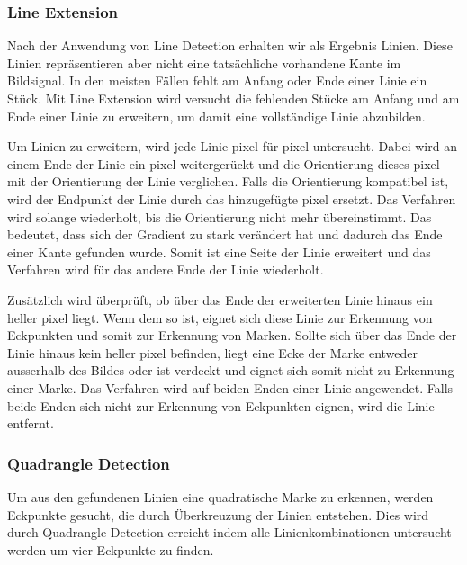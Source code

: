 \subsubsection{Line Extension} %
\label{sub:line_extension}

Nach der Anwendung von Line Detection erhalten wir als Ergebnis Linien. Diese Linien repräsentieren aber nicht eine
 tatsächliche vorhandene Kante im Bildsignal. In den meisten Fällen fehlt am Anfang oder
 Ende einer Linie ein Stück. Mit Line Extension wird versucht die fehlenden Stücke am Anfang und am Ende einer Linie zu
 erweitern, um damit eine vollständige Linie abzubilden.

Um Linien zu erweitern, wird jede Linie \gls{pixel} für \gls{pixel} untersucht. Dabei wird an einem Ende der Linie
 ein \gls{pixel} weitergerückt und die Orientierung dieses \gls{pixel} mit der Orientierung der Linie verglichen. Falls
 die Orientierung kompatibel ist, wird der Endpunkt der Linie durch das hinzugefügte \gls{pixel} ersetzt. Das Verfahren
 wird solange wiederholt, bis die Orientierung nicht mehr übereinstimmt. Das bedeutet, dass sich der Gradient zu stark
 verändert hat und dadurch das Ende einer Kante gefunden wurde. Somit ist eine Seite der Linie erweitert und das
 Verfahren wird für das andere Ende der Linie wiederholt.

Zusätzlich wird überprüft, ob über das Ende der erweiterten Linie hinaus ein heller \gls{pixel} liegt. Wenn dem so ist,
 eignet sich diese Linie zur Erkennung von Eckpunkten und somit zur Erkennung von Marken. Sollte sich über das Ende der
 Linie hinaus kein heller \gls{pixel} befinden, liegt eine Ecke der Marke entweder ausserhalb des Bildes oder ist
 verdeckt und eignet sich somit nicht zu Erkennung einer Marke. Das Verfahren wird auf beiden Enden einer Linie
 angewendet. Falls beide Enden sich nicht zur Erkennung von Eckpunkten eignen, wird die Linie entfernt.

\subsubsection{Quadrangle Detection} %
\label{sub:quadrangle_detection}

Um aus den gefundenen Linien eine quadratische Marke zu erkennen, werden Eckpunkte gesucht, die durch Überkreuzung der
 Linien entstehen. Dies wird durch Quadrangle Detection erreicht indem alle Linienkombinationen untersucht werden um
 vier Eckpunkte zu finden.


